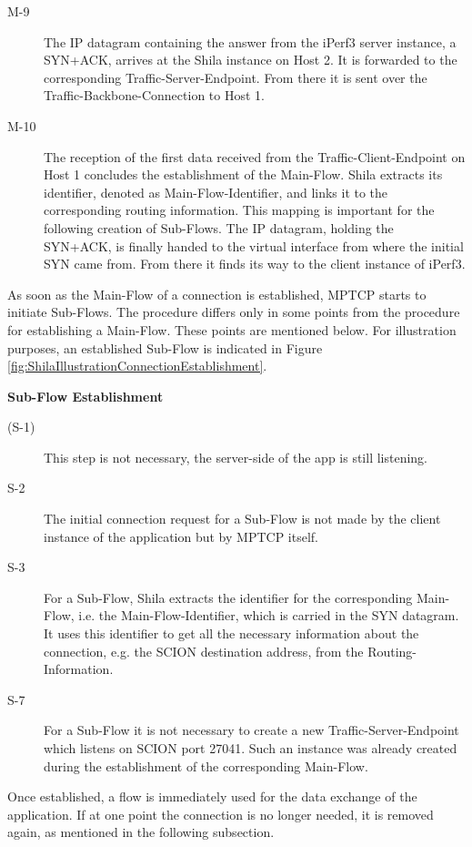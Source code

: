 \begin{description}
	\item[M-9] The IP datagram containing the answer from the iPerf3 server instance, a SYN+ACK, arrives at the Shila instance on Host 2. It is forwarded to the corresponding Traffic-Server-Endpoint. From there it is sent over the Traffic-Backbone-Connection to Host 1.
	\item[M-10] The reception of the first data received from the Traffic-Client-Endpoint on Host 1 concludes the establishment of the Main-Flow. Shila extracts its identifier, denoted as Main-Flow-Identifier, and links it to the corresponding routing information. This mapping is important for the following creation of Sub-Flows. The IP datagram, holding the SYN+ACK, is finally handed to the virtual interface from where the initial SYN came from. From there it finds its way to the client instance of iPerf3.
\end{description}

As soon as the Main-Flow of a connection is established, MPTCP starts to initiate Sub-Flows. The procedure differs only in some points from the procedure for establishing a Main-Flow. These points are mentioned below. For illustration purposes, an established Sub-Flow is indicated in Figure \ref{fig:ShilaIllustrationConnectionEstablishment}.

\textbf{Sub-Flow Establishment}

\begin{description}
	\item[(S-1)] This step is not necessary, the server-side of the app is still listening.
	\item[S-2] The initial connection request for a Sub-Flow is not made by the client instance of the application but by MPTCP itself.
	\item[S-3] For a Sub-Flow, Shila extracts the identifier for the corresponding Main-Flow, i.e. the Main-Flow-Identifier, which is carried in the  SYN datagram. It uses this identifier to get all the necessary information about the connection, e.g. the SCION destination address, from the Routing-Information.
	\item[S-7] For a Sub-Flow it is not necessary to create a new Traffic-Server-Endpoint which listens on SCION port {\footnotesize 27041}. Such an instance was already created during the establishment of the corresponding Main-Flow.
\end{description} 

Once established, a flow is immediately used for the data exchange of the application. If at one point the connection is no longer needed, it is removed again, as mentioned in the following subsection.

